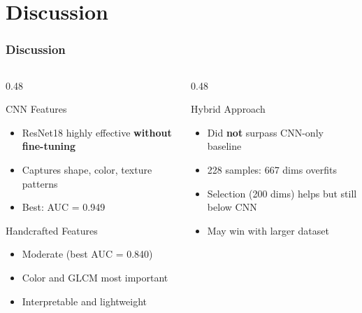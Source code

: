\documentclass[aspectratio=169,professionalfonts]{beamer}
\begin{document}
\section{Discussion}

\begin{frame}
    \frametitle{Discussion}
    \footnotesize
    
    \begin{columns}[T]
        \begin{column}{0.48\textwidth}
            \begin{block}{\footnotesize CNN Features}
                \footnotesize
                \begin{itemize}
                    \setlength{\itemsep}{1pt}
                    \item ResNet18 highly effective \textbf{without fine-tuning}
                    \item Captures shape, color, texture patterns
                    \item Best: AUC = 0.949
                \end{itemize}
            \end{block}
            
            \begin{exampleblock}{\footnotesize Handcrafted Features}
                \footnotesize
                \begin{itemize}
                    \setlength{\itemsep}{1pt}
                    \item Moderate (best AUC = 0.840)
                    \item Color and GLCM most important
                    \item Interpretable and lightweight
                \end{itemize}
            \end{exampleblock}
        \end{column}
        
        \begin{column}{0.48\textwidth}
            \begin{alertblock}{\footnotesize Hybrid Approach}
                \footnotesize
                \begin{itemize}
                    \setlength{\itemsep}{1pt}
                    \item Did \textbf{not} surpass CNN-only baseline
                    \item 228 samples: 667 dims overfits
                    \item Selection (200 dims) helps but still below CNN
                    \item May win with larger dataset
                \end{itemize}
            \end{alertblock}
            

\end{column}
\end{columns}
\end{frame}
\end{document}
